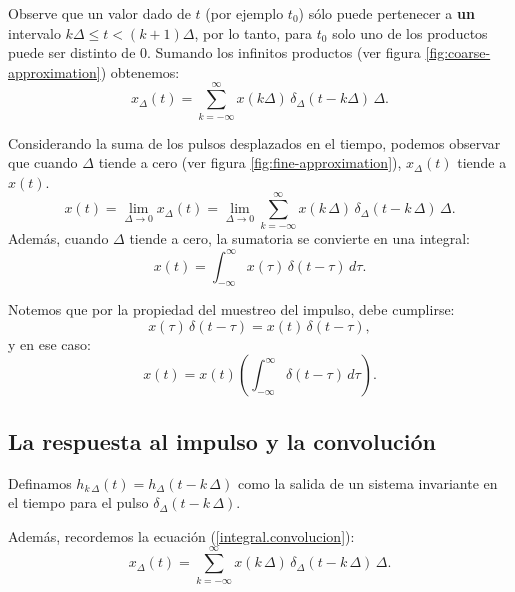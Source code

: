 Observe que un valor dado de $t$ (por ejemplo $t_{0}$) sólo puede pertenecer a \textbf{un} intervalo $k\Delta \leq t < (k+1)\Delta$, por lo tanto, para $t_{0}$ solo uno de los productos puede ser distinto de $0$. Sumando los infinitos productos (ver figura \ref{fig:coarse-approximation}) obtenemos:
\begin{equation}
	x_{\Delta}(t) = \sum_{k=-\infty}^{\infty} x(k\Delta) \, \delta_{\Delta}(t-k\Delta) \, \Delta .
\end{equation}

Considerando la suma de los pulsos desplazados en el tiempo, podemos observar que cuando $\Delta$ tiende a cero (ver figura \ref{fig:fine-approximation}), $x_{\Delta}(t)$ tiende a $x(t)$.
\begin{equation}
	x(t) = \lim_{\Delta \to 0} x_{\Delta}(t) = \lim_{\Delta \to 0} \sum_{k=-\infty}^{\infty} x(k \, \Delta) \, \delta_{\Delta}(t-k \, \Delta) \, \Delta .
\end{equation}
Además, cuando $\Delta$ tiende a cero, la sumatoria se convierte en una integral:
\begin{equation}
	x(t) = \int_{-\infty}^{\infty} x(\tau) \, \delta(t-\tau) \, d\tau . \label{integral.convolucion}
\end{equation}

Notemos que por la propiedad del muestreo del impulso, debe cumplirse:
\begin{equation} 
	x(\tau) \, \delta(t-\tau) = x(t) \, \delta(t-\tau),
\end{equation}
y en ese caso:
\begin{equation}
	x(t) = x(t) \left( \int_{-\infty}^{\infty} \delta(t-\tau) \, d\tau \right).
\end{equation}

\subsection{La respuesta al impulso y la convolución}

Definamos $h_{k \, \Delta }(t) = h_{\Delta}\left( t-k \, \Delta \right)$ como la salida de un sistema invariante en el tiempo para el pulso $\delta_{\Delta}(t-k \, \Delta)$. 

Además, recordemos la ecuación (\ref{integral.convolucion}):
\begin{equation}
	x_{\Delta}(t) = \sum_{k=-\infty}^{\infty} x(k \, \Delta) \, \delta_{\Delta}(t-k \, \Delta) \, \Delta .
\end{equation}

